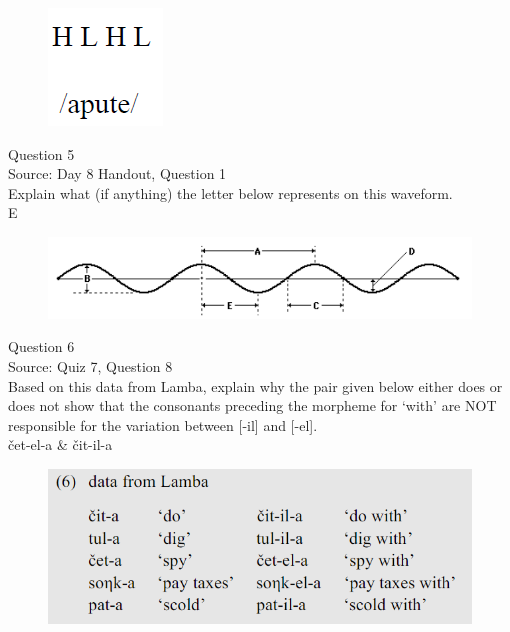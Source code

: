 \documentclass[12pt]{article}
\begin{document}
\begin{figure}[H]
\includegraphics{../images/mendetone_d.png}
\end{figure}

\newpage

{\large Question 5}\\

Source: Day 8 Handout, Question 1\\

Explain what (if anything) the letter below represents on this waveform.\\

E

\begin{figure}[H]
\includegraphics{../images/sinusoid.png}
\end{figure}

\newpage

{\large Question 6}\\

Source: Quiz 7, Question 8\\

Based on this data from Lamba, explain why the pair given below either does or does not show that the consonants preceding the morpheme for `with' are NOT responsible for the variation between [-il] and [-el].\\

čet-el-a \& čit-il-a

\begin{figure}[H]
\includegraphics{../images/peng119_lamba.png}
\end{figure}

\newpage

\begin{center}
\textbf{{\color{red}{\HUGE END OF EXAM}}}\\

\end{center}
\newpage
\end{document}
